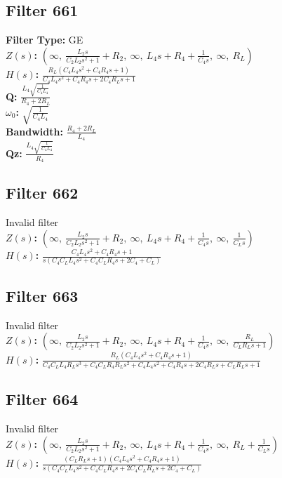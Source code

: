 \documentclass{article}
\begin{document}
\subsection*{Filter 661}
\textbf{Filter Type:} GE \\ 
\textbf{$Z(s)$:} $\left( \infty, \  \frac{L_{2} s}{C_{2} L_{2} s^{2} + 1} + R_{2}, \  \infty, \  L_{4} s + R_{4} + \frac{1}{C_{4} s}, \  \infty, \  R_{L}\right)$ \\ 
\textbf{$H(s)$:} $\frac{R_{L} \left(C_{4} L_{4} s^{2} + C_{4} R_{4} s + 1\right)}{C_{4} L_{4} s^{2} + C_{4} R_{4} s + 2 C_{4} R_{L} s + 1}$ \\ 
\textbf{Q:} $\frac{L_{4} \sqrt{\frac{1}{C_{4} L_{4}}}}{R_{4} + 2 R_{L}}$ \\ 
\textbf{$\omega_0$:} $\sqrt{\frac{1}{C_{4} L_{4}}}$ \\ 
\textbf{Bandwidth:} $\frac{R_{4} + 2 R_{L}}{L_{4}}$ \\ 
\textbf{Qz:} $\frac{L_{4} \sqrt{\frac{1}{C_{4} L_{4}}}}{R_{4}}$ \\ 
\subsection*{Filter 662}
Invalid filter \\ 
\textbf{$Z(s)$:} $\left( \infty, \  \frac{L_{2} s}{C_{2} L_{2} s^{2} + 1} + R_{2}, \  \infty, \  L_{4} s + R_{4} + \frac{1}{C_{4} s}, \  \infty, \  \frac{1}{C_{L} s}\right)$ \\ 
\textbf{$H(s)$:} $\frac{C_{4} L_{4} s^{2} + C_{4} R_{4} s + 1}{s \left(C_{4} C_{L} L_{4} s^{2} + C_{4} C_{L} R_{4} s + 2 C_{4} + C_{L}\right)}$ \\ 
\subsection*{Filter 663}
Invalid filter \\ 
\textbf{$Z(s)$:} $\left( \infty, \  \frac{L_{2} s}{C_{2} L_{2} s^{2} + 1} + R_{2}, \  \infty, \  L_{4} s + R_{4} + \frac{1}{C_{4} s}, \  \infty, \  \frac{R_{L}}{C_{L} R_{L} s + 1}\right)$ \\ 
\textbf{$H(s)$:} $\frac{R_{L} \left(C_{4} L_{4} s^{2} + C_{4} R_{4} s + 1\right)}{C_{4} C_{L} L_{4} R_{L} s^{3} + C_{4} C_{L} R_{4} R_{L} s^{2} + C_{4} L_{4} s^{2} + C_{4} R_{4} s + 2 C_{4} R_{L} s + C_{L} R_{L} s + 1}$ \\ 
\subsection*{Filter 664}
Invalid filter \\ 
\textbf{$Z(s)$:} $\left( \infty, \  \frac{L_{2} s}{C_{2} L_{2} s^{2} + 1} + R_{2}, \  \infty, \  L_{4} s + R_{4} + \frac{1}{C_{4} s}, \  \infty, \  R_{L} + \frac{1}{C_{L} s}\right)$ \\ 
\textbf{$H(s)$:} $\frac{\left(C_{L} R_{L} s + 1\right) \left(C_{4} L_{4} s^{2} + C_{4} R_{4} s + 1\right)}{s \left(C_{4} C_{L} L_{4} s^{2} + C_{4} C_{L} R_{4} s + 2 C_{4} C_{L} R_{L} s + 2 C_{4} + C_{L}\right)}$ \\ 
\end{document}
